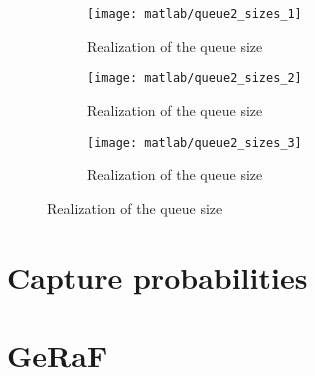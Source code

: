 \documentclass[a4paper,oneside]{article}
\begin{document}
\begin{figure}[htbp]
  \centering
  \begin{subfigure}{0.5\textwidth}
    \centering
    \texttt{[image: matlab/queue2\_sizes\_1]}
    \caption{Realization of the queue size}
    \label{plot:queue2_sizes_unstable}
  \end{subfigure}%
  \begin{subfigure}{0.5\textwidth}
    \centering
    \texttt{[image: matlab/queue2\_sizes\_2]}
    \caption{Realization of the queue size}
    \label{plot:queue2_sizes_limit}
  \end{subfigure}
  \begin{subfigure}{0.5\textwidth}
    \centering
    \texttt{[image: matlab/queue2\_sizes\_3]}
    \caption{Realization of the queue size}
    \label{plot:queue2_sizes_stable}
  \end{subfigure}
\end{figure}


\section{Capture probabilities}
\section{GeRaF}
\end{document}
